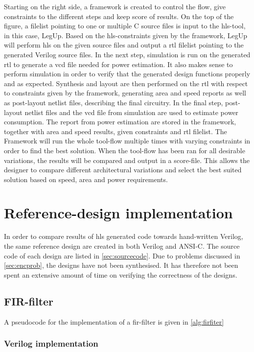 Starting on the right side, a framework is created to control the flow, give constraints to the different steps and keep score of results. On the top of the figure, a filelist pointing to one or multiple C source files is input to the \gls{hls}-tool, in this case, LegUp. Based on the \gls{hls}-constraints given by the framework, LegUp will perform \gls{hls} on the given source files and output a \gls{rtl} filelist pointing to the generated Verilog source files. In the next step, simulation is run on the generated \gls{rtl} to generate a \gls{vcd} file needed for power estimation. It also makes sense to perform simulation in order to verify that the generated design functions properly and as expected. Synthesis and layout are then performed on the \gls{rtl} with respect to constraints given by the framework, generating area and speed reports as well as post-layout netlist files, describing the final circuitry. In the final step, post-layout netlist files and the \gls{vcd} file from simulation are used to estimate power consumption. The report from power estimation are stored in the framework, together with area and speed results, given constraints and \gls{rtl} filelist. The Framework will run the whole tool-flow multiple times with varying constraints in order to find the best solution. When the tool-flow has been ran for all desirable variations, the results will be compared and output in a score-file. This allows the designer to compare different architectural variations and select the best suited solution based on speed, area and power requirements.

\section{Reference-design implementation}
In order to compare results of \gls{hls} generated code towards hand-written Verilog, the same reference design are created in both Verilog and ANSI-C. The source code of each design are listed in \cref{sec:sourcecode}. Due to problems discussed in \cref{sec:encprob}, the designs have not been synthesised. It has therefore not been spent an extensive amount of time on verifying the correctness of the designs.
\subsection{FIR-filter}

A pseudocode for the implementation of a \gls{fir}-filter is given in \cref{alg:firfiter}

\subsubsection{Verilog implementation}

